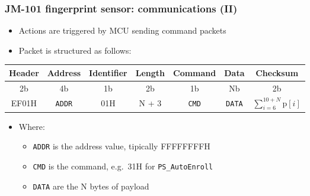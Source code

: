 \documentclass[handout]{beamer}
\begin{document}
\begin{frame}
  \frametitle{JM-101 fingerprint sensor: communications (II)}

  \begin{itemize}
    \item Actions are triggered by MCU sending command packets
    \item Packet is structured as follows:
  \end{itemize}

  \begin{table}
    \centering
    \footnotesize
    \begin{tabular}{ccccccc}
      \toprule
      Header & Address       & Identifier & Length & Command      & Data          & Checksum                          \\
      \midrule
      2b     & 4b            & 1b         & 2b     & 1b           & Nb            & 2b                                \\
      \midrule
      EF01H  & \texttt{ADDR} & 01H        & N + 3  & \texttt{CMD} & \texttt{DATA} & $\sum_{i=6}^{10+N} \textrm{p}[i]$ \\
      \bottomrule
    \end{tabular}
  \end{table}

  \begin{itemize}
    \item Where:
          \begin{itemize}
            \item \texttt{ADDR} is the address value, tipically FFFFFFFFH
            \item \texttt{CMD} is the command, e.g.\ 31H for
                  \texttt{PS\_AutoEnroll}
            \item \texttt{DATA} are the N bytes of payload
          \end{itemize}
  \end{itemize}
\end{frame}
\end{document}
